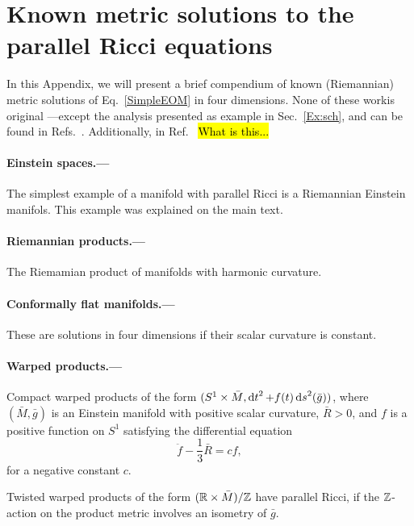 \section{Known metric solutions to the parallel Ricci equations}

In this Appendix, we will present a brief compendium of known (Riemannian) metric solutions of Eq.~\eqref{SimpleEOM} in four dimensions. None of these workis original ---except the analysis presented as example in Sec.~\ref{Ex:sch}, and can be found in Refs.~\cite{gray1978einstein,derdzinski1980classification,derdzinski1982compact,Derdzinski:1985,Besse}. Additionally, in Ref.~\cite{cahen2000symplectic} \hl{What is this...}

\paragraph{Einstein spaces.---} The simplest example of a manifold with parallel Ricci is a Riemannian Einstein manifols. This example was explained on the main text.

\paragraph{Riemannian products.---} The Riemamian product of manifolds with harmonic curvature.

\paragraph{Conformally flat manifolds.---} These are solutions in four dimensions if their scalar curvature is constant.


\paragraph{Warped products.---} Compact warped products of the form \mbox{$(S^1 \times \bar{M}, \mathop{\mathrm{d}t}\nolimits^2 + f(t) \mathop{\mathrm{d}s}\nolimits^2(\bar{g}) )$,} where $(\bar{M}, \bar{g})$ is an Einstein manifold with positive scalar curvature, $\bar{R} > 0$, and $f$ is a positive function on $S^1$ satisfying the differential equation
\begin{equation}
  \ddot{f} - \frac{1}{3} \bar{R} = c f,
\end{equation}
for a negative constant $c$.

{Twisted} warped products of the form $(\mathbb{R} \times \bar{M} ) / \mathbb{Z}$ have parallel Ricci, if the $\mathbb{Z}$-action on the product metric involves an isometry of $\bar{g}$.


